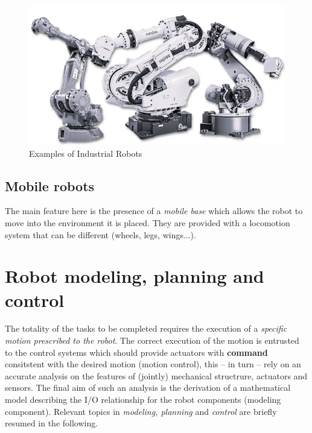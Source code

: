 \begin{figure}
    \centering
    \includegraphics[scale=0.4]{img/3_Industrial_Robots.png}
    \caption{Examples of Industrial Robots}
\end{figure}

\subsection{Mobile robots}
The main feature here is the presence of a \textit{mobile base} which allows the robot to move into the environment it is placed. They are provided with a locomotion system that can be different (wheels, legs, wings...).



\section{Robot modeling, planning and control}
The totality of the tasks to be completed requires the execution of a \textit{specific motion prescribed to the robot}. The correct execution of the motion is entrusted to the control systems which should provide actuators with \textbf{command} consitstent with the desired motion (motion control), this -- in turn -- rely on an accurate analysis on the features of (jointly) mechanical structrure, actuators and sensors. The final aim of such an analysis is the derivation of a mathematical model describing the I/O relationship for the robot components (modeling component). Relevant topics in \textit{modeling, planning} and \textit{control} are briefly resumed in the following. 
\vspace{-0.3cm}
